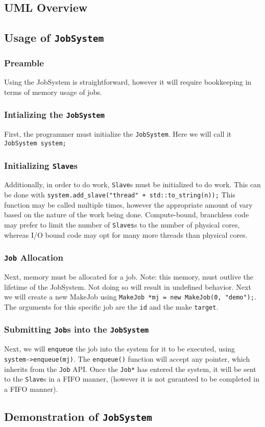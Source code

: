 \documentclass{article}
\begin{document}
	\subsection{UML Overview}
		
	\subsection{Usage of \texttt{JobSystem}}
		\subsubsection{Preamble}
			Using the JobSystem is straightforward, however it will require bookkeeping in terms of memory usage of jobs. 
		\subsubsection{Intializing the \texttt{JobSystem}}
			First, the programmer must initialize the \texttt{JobSystem}. Here we will call it \texttt{JobSystem system;}
		\subsubsection{Initializing \texttt{Slave}s}
			Additionally, in order to do work, \texttt{Slave}s must be initialized to do work. This can be done with \texttt{system.add\_slave("thread" + std::to\_string(n));} This function may be called multiple times, however the appropriate amount of vary based on the nature of the work being done. Compute-bound, branchless code may prefer to limit the number of \texttt{Slaves}s to the number of physical cores, whereas I/O bound code may opt for many more threads than physical cores.
		\subsubsection{\texttt{Job} Allocation}
			Next, memory must be allocated for a job. Note: this memory, must outlive the lifetime of the JobSystem. Not doing so will result in undefined behavior. Next we will create a new MakeJob using \texttt{MakeJob *mj = new MakeJob(0, "demo");}. The arguments for this specific job are the \texttt{id} and the make \texttt{target}. 
		\subsubsection{Submitting \texttt{Job}s into the \texttt{JobSystem}}
			Next, we will \texttt{enqueue} the job into the system for it to be executed, using \texttt{system->enqueue(mj)}. The \texttt{enqueue()} function will accept any pointer, which inherits from the \texttt{Job} API. Once the \texttt{Job*} has entered the system, it will be sent to the \texttt{Slave}s in a FIFO manner, (however it is not guranteed to be completed in a FIFO manner).
	
	\subsection{Demonstration of \texttt{JobSystem}}
\end{document}
